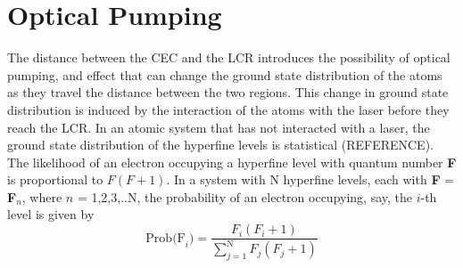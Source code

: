\documentclass[12pt,a4paper,margin=1in]{report}
\begin{document}
\section{Optical Pumping}

The distance between the CEC and the LCR introduces the possibility of optical pumping, and effect that can change the ground state distribution of the atoms as they travel the distance between the two regions. This change in ground state distribution is induced by the interaction of the atoms with the laser before they reach the LCR. In an atomic system that has not interacted with a laser, the ground state distribution of the hyperfine levels is statistical (REFERENCE). The likelihood of an electron occupying a hyperfine level with quantum number \textbf{F} is proportional to $F(F+1)$. In a system with N hyperfine levels, each with \textbf{F} = \textbf{F}$_n$, where $n$ = 1,2,3,..N, the probability of an electron occupying, say, the $i$-th level is given by
\begin{equation}
\mathrm{Prob(F}_i) = \frac{F_i(F_i+1)}{\sum_{j=1}^\mathrm{N}F_j(F_j+1)}
\end{equation}
\end{document}
